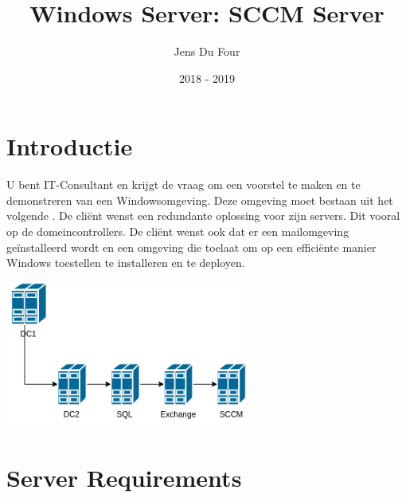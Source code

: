\documentclass[a4paper]{article}
\title{Windows Server: SCCM Server}
\author{Jens Du Four}
\date{2018 - 2019}
\begin{document}
\maketitle

\section{Introductie}
U bent IT-Consultant en krijgt de vraag om een voorstel te maken en te demonstreren van een Windowsomgeving. Deze omgeving moet bestaan uit het volgende . De cliënt wenst een redundante oplossing voor zijn servers. Dit vooral op de domeincontrollers. De cliënt wenst ook dat er een mailomgeving geïnstalleerd wordt en een omgeving die toelaat om op een efficiënte manier Windows toestellen te installeren en te deployen.

\begin{center}
\includegraphics[width=8cm]{Netwerkdiagram.png}
\end{center}

\section{Server Requirements}
\end{document}
